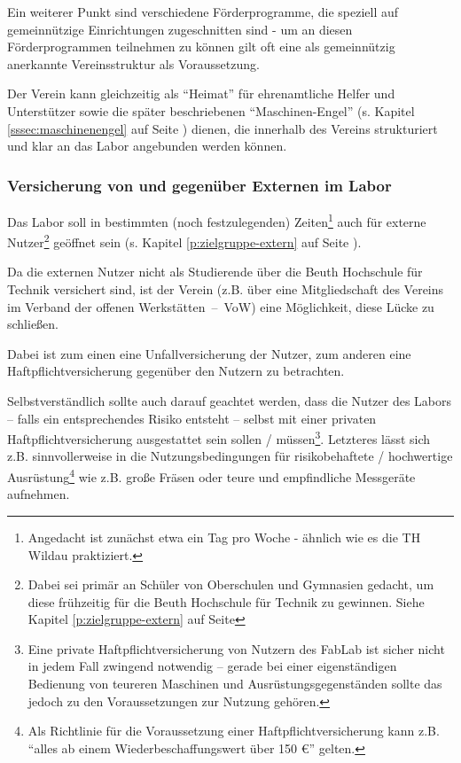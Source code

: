 \documentclass[parskip=half,headsepline,footsepline,titlepage]{scrartcl}
\begin{document}
Ein weiterer Punkt sind verschiedene Förderprogramme, die speziell auf gemeinnützige Einrichtungen zugeschnitten sind - um an diesen Förderprogrammen teilnehmen zu können gilt oft eine als gemeinnützig anerkannte Vereinsstruktur als Voraussetzung.

Der Verein kann gleichzeitig als ``Heimat'' für ehrenamtliche Helfer und Unterstützer sowie die später beschriebenen ``Maschinen-Engel'' (s. Kapitel \ref{sssec:maschinenengel} auf Seite \pageref{sssec:maschinenengel}) dienen, die innerhalb des Vereins strukturiert und klar an das Labor angebunden werden können.


\subsubsection{Versicherung von und gegenüber Externen im Labor}
Das Labor soll in bestimmten (noch festzulegenden) Zeiten\footnote{Angedacht ist zunächst etwa ein Tag pro Woche - ähnlich wie es die TH Wildau praktiziert.} auch für externe Nutzer\footnote{Dabei sei primär an Schüler von Oberschulen und Gymnasien gedacht, um diese frühzeitig für die Beuth Hochschule für Technik zu gewinnen. Siehe Kapitel \ref{p:zielgruppe-extern} auf Seite \pageref{p:zielgruppe-extern}} geöffnet sein (s. Kapitel \ref{p:zielgruppe-extern} auf Seite \pageref{p:zielgruppe-extern}). 

Da die externen Nutzer nicht als Studierende über die Beuth Hochschule für Technik versichert sind, ist der Verein (z.B. über eine Mitgliedschaft des Vereins im Verband der offenen Werkstätten~--~VoW) eine Möglichkeit, diese Lücke zu schließen.

Dabei ist zum einen eine Unfallversicherung der Nutzer, zum anderen eine Haftpflichtversicherung gegenüber den Nutzern zu betrachten.

Selbstverständlich sollte auch darauf geachtet werden, dass die Nutzer des Labors -- falls ein entsprechendes Risiko entsteht -- selbst mit einer privaten Haftpflichtversicherung ausgestattet sein sollen / müssen\footnote{Eine private Haftpflichtversicherung von Nutzern des FabLab ist sicher nicht in jedem Fall zwingend notwendig -- gerade bei einer eigenständigen Bedienung von teureren Maschinen und Ausrüstungsgegenständen sollte das jedoch zu den Voraussetzungen zur Nutzung gehören.}. Letzteres lässt sich z.B. sinnvollerweise in die Nutzungsbedingungen für risikobehaftete / hochwertige Ausrüstung\footnote{Als Richtlinie für die Voraussetzung einer Haftpflichtversicherung kann z.B. ``alles ab einem Wiederbeschaffungswert über 150 \euro'' gelten.} wie z.B. große Fräsen oder teure und empfindliche Messgeräte aufnehmen.
\end{document}
